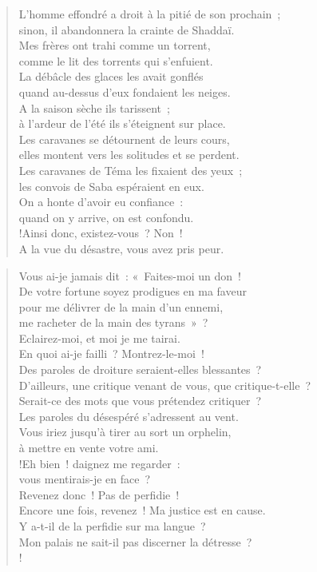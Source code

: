 \documentclass[french,twoside]{book} %
\def\mednobreak{\ifdim\lastskip<\medskipamount
  \removelastskip\nopagebreak\medskip\fi}
\newcommand{\labelblock}[1]{\medbreak{\noindent\color{rubric}\bfseries #1}\par\mednobreak}
\newcommand\chapterclose{} %
\begin{document}
\begin{verse}
L’homme effondré a droit à la pitié de son prochain ; \\
sinon, il abandonnera la crainte de Shaddaï.\\
Mes frères ont trahi comme un torrent, \\
comme le lit des torrents qui s’enfuient.\\
La débâcle des glaces les avait gonflés \\
quand au-dessus d’eux fondaient les neiges.\\
A la saison sèche ils tarissent ; \\
à l’ardeur de l’été ils s’éteignent sur place.\\
Les caravanes se détournent de leurs cours, \\
elles montent vers les solitudes et se perdent.\\
Les caravanes de Téma les fixaient des yeux ; \\
les convois de Saba espéraient en eux.\\
On a honte d’avoir eu confiance : \\
quand on y arrive, on est confondu.\\!Ainsi donc, existez-vous ? Non ! \\
A la vue du désastre, vous avez pris peur.\\

\end{verse}

\labelblock{Paroles d’un désespéré}


\begin{verse}
Vous ai-je jamais dit : « Faites-moi un don ! \\
De votre fortune soyez prodigues en ma faveur\\
pour me délivrer de la main d’un ennemi, \\
me racheter de la main des tyrans » ?\\
Eclairez-moi, et moi je me tairai. \\
En quoi ai-je failli ? Montrez-le-moi !\\
Des paroles de droiture seraient-elles blessantes ? \\
D’ailleurs, une critique venant de vous, que critique-t-elle ?\\
Serait-ce des mots que vous prétendez critiquer ? \\
Les paroles du désespéré s’adressent au vent.\\
Vous iriez jusqu’à tirer au sort un orphelin, \\
à mettre en vente votre ami.\\!Eh bien ! daignez me regarder : \\
vous mentirais-je en face ?\\
Revenez donc ! Pas de perfidie ! \\
Encore une fois, revenez ! Ma justice est en cause.\\
Y a-t-il de la perfidie sur ma langue ? \\
Mon palais ne sait-il pas discerner la détresse ?\\!
\end{verse}
\chapterclose
\end{document}
